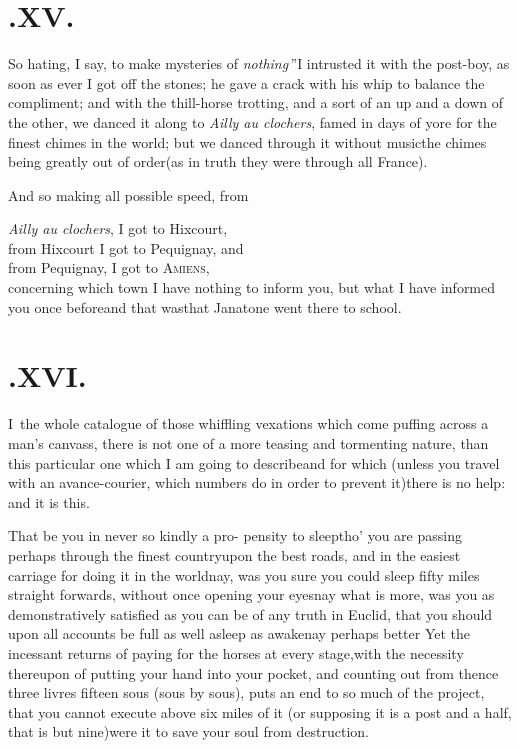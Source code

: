\documentclass{article}
\begin{document}
\vfill{}\eject
\section{.\enspace XV.}

\quad\tsh \lqq So hating, I say, to make\break
mysteries
of \textit{nothing}\,”\tsh I intrusted it with the
post-boy, as soon as ever I got off the stones; he gave a crack
with his whip to balance the compliment;\break
and with the thill-horse
trotting, and a sort of an up and a down of the other, we danced it
along to \textit{Ailly au clochers}, famed in days of yore for the
finest chimes in the world; but we danced through it without
music\tsk the chimes being greatly out of order\tsk (as in
truth they were through all France).

And so making all possible speed, from

\noindent
\textit{Ailly au clochers}, I got to Hixcourt,\\
\newpage\noindent
from Hixcourt I got to Pequignay, and\\
from Pequignay, I got to \textsc{Amiens},\\[4pt]
concerning which town I have nothing to inform you, but what I have
informed you once before\tsh and that was\tsh that
Janatone went there to school.

\section{.\enspace XVI.}

\lettrine{I}{\,} the whole catalogue of those
whiffling vexations which come puffing across a man’s
canvass, there is not one of a more teasing and tormenting nature,
than this particular one which I am going to
describe\tsh and for which (unless you travel with an
avance-courier, which numbers do in order to prevent
it)\tsh there is no help: and it is this.

That be you in never so kindly a pro-\break
pensity to sleep\tsh tho’ you are passing perhaps through the
finest country\tsk upon the best roads, and in the easiest
carriage for doing it in the world\tsh nay, was you sure you could sleep fifty miles straight
forwards, without once opening your eyes\tsk nay what is more,
was you as demonstratively satisfied as you can be of any truth in
Euclid, that you should upon all accounts be full as well
asleep as awake\tsh nay perhaps better\tsh\break
Yet the incessant returns of paying for the horses at every
stage,\tsh with the necessity thereupon of putting your
hand into your pocket, and counting out from thence three livres
fifteen sous (sous by sous), puts an end to so much of the project,
that you cannot execute above six miles of it (or supposing it is a
post and a half, that is but nine)\tsh were it to save
your soul from destruction.
\end{document}
